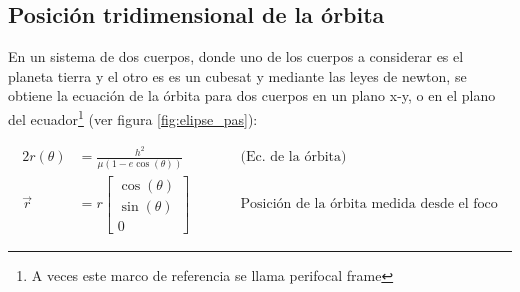 \subsection{Posición tridimensional de la órbita}

En un sistema de dos cuerpos, donde uno de los cuerpos a considerar es el planeta tierra y el otro es es un cubesat y mediante las leyes de newton, se obtiene la ecuación de la órbita para dos cuerpos en un plano x-y, o en el plano del ecuador\footnote{A veces este marco de referencia se llama perifocal frame} (ver figura \ref{fig:elipse_pas}): 

\begin{alignat}{2}
r(\theta) &= \frac{h^2}{\mu (1 - e \cos(\theta))} &\qquad& \text{(Ec. de la órbita)} \\
\vec{r}   &= r \begin{bmatrix}
	\cos(\theta) \\ 
	\sin(\theta) \\ 
	0
\end{bmatrix} && \text{Posición de la órbita medida desde el foco}
\end{alignat}


